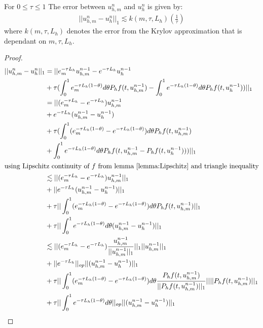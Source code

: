 \begin{lemma}\label{lemma:krylovbound}
    For $0\leq \tau \leq 1$
    The error between $u_{h,m}^n$ and $u_{h}^n$ is given by:
    \begin{align*}
        ||u_{h,m}^n - u_{h}^n||_1 \lesssim k(m,\tau, L_h)(\frac{1}{\tau})
    \end{align*}
    where $k(m,\tau,L_h)$ denotes the error from the Krylov approximation that is dependant on $m, \tau, L_h$.
\end{lemma}
\begin{proof}
    \begin{align*}
        ||u_{h,m}^n - u_{h}^n||_1 &= ||e_m^{-\tau L_h}u_{h,m}^{n-1} - e^{-\tau L_h}u_{h}^{n-1}\\
        & + \tau(\int^1_0e_m^{-\tau L_h(1-\theta)}d\theta P_hf(t, u_{h,m}^{n-1}) - \int^1_0e^{-\tau L_h(1-\theta)}d\theta P_hf(t, u_{h}^{n-1}))||_1\\
        &= ||(e_m^{-\tau L_h}-e^{-\tau L_h})u_{h,m}^{n-1} \\
        & + e^{-\tau L_h}(u_{h,m}^{n-1}-u_{h}^{n-1})\\
        & + \tau(\int^1_0 (e_m^{-\tau L_h(1-\theta)}-e^{-\tau L_h(1-\theta)}) d\theta P_hf(t, u_{h,m}^{n-1})\\
        & + \int^1_0e^{-\tau L_h(1-\theta)}d\theta P_hf(t, u_{h,m}^{n-1}- P_hf(t, u_{h}^{n-1})))||_1\\
        \intertext{using Lipschitz continuity of $f$ from lemma \ref{lemma:Lipschitz} and triangle inequality}
        & \lesssim ||(e_m^{-\tau L_h}-e^{-\tau L_h})u_{h,m}^{n-1}||_1 \\
        & + ||e^{-\tau L_h}(u_{h,m}^{n-1}-u_{h}^{n-1})||_1 \\
        & + \tau||\int^1_0 (e_m^{-\tau L_h(1-\theta)}-e^{-\tau L_h(1-\theta)}) d\theta P_hf(t, u_{h,m}^{n-1})||_1 \\
        & + \tau||\int^1_0e^{-\tau L_h(1-\theta)}d\theta (u_{h,m}^{n-1}- u_{h}^{n-1})||_1 \\
        & \lesssim ||(e_m^{-\tau L_h}-e^{-\tau L_h})\frac{u_{h,m}^{n-1}}{||u_{h,m}^{n-1}||_1}||_1||u_{h,m}^{n-1}||_1 \\
        & + ||e^{-\tau L_h}||_{op}||(u_{h,m}^{n-1}-u_{h}^{n-1})||_1 \\
        & + \tau||\int^1_0 (e_m^{-\tau L_h(1-\theta)}-e^{-\tau L_h(1-\theta)}) d\theta \frac{P_hf(t, u_{h,m}^{n-1})}{|| P_hf(t, u_{h,m}^{n-1})||_1}|||| P_hf(t, u_{h,m}^{n-1})||_1 \\
        & + \tau||\int^1_0e^{-\tau L_h(1-\theta)}d\theta||_{op}|| (u_{h,m}^{n-1}- u_{h}^{n-1})||_1 \\

\end{align*}
\end{proof}
